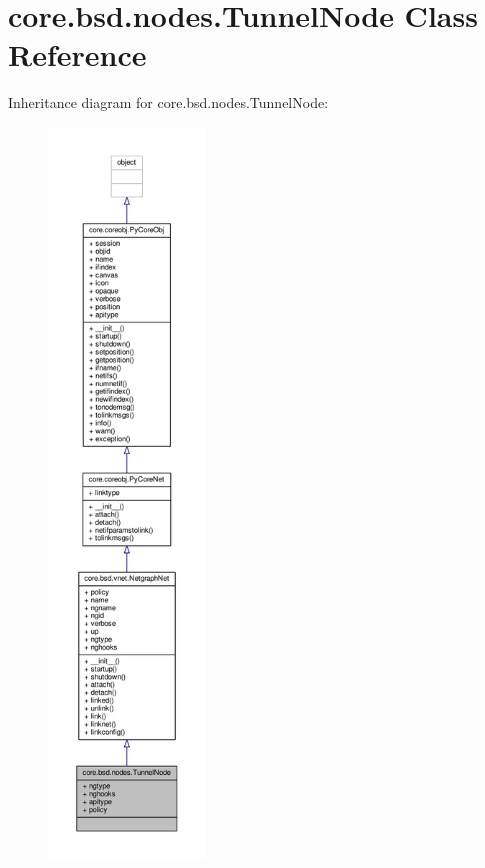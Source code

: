 \hypertarget{classcore_1_1bsd_1_1nodes_1_1_tunnel_node}{\section{core.\+bsd.\+nodes.\+Tunnel\+Node Class Reference}
\label{classcore_1_1bsd_1_1nodes_1_1_tunnel_node}
}


Inheritance diagram for core.\+bsd.\+nodes.\+Tunnel\+Node\+:
\nopagebreak
\begin{figure}[H]
\begin{center}
\leavevmode
\includegraphics[height=550pt]{classcore_1_1bsd_1_1nodes_1_1_tunnel_node__inherit__graph}
\end{center}
\end{figure}


